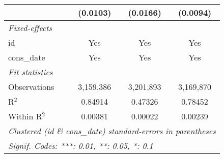 \begin{tabular}{lccc}
                                                             & (0.0103)        & (0.0166)       & (0.0094)\\
   \midrule \emph{Fixed-effects} &   &   &  \\
   id                                                        & Yes             & Yes            & Yes\\
   cons\_date                                               & Yes             & Yes            & Yes\\
   \midrule \emph{Fit statistics} &   &   &  \\
   Observations                                              & 3,159,386       & 3,201,893      & 3,169,870\\
   R$^2$                                                     & 0.84914         & 0.47326        & 0.78452\\
   Within R$^2$                                              & 0.00381         & 0.00022        & 0.00239\\
   \midrule\midrule\multicolumn{4}{l}{\emph{Clustered (id \& cons\_date) standard-errors in parentheses}}\\
   \multicolumn{4}{l}{\emph{Signif. Codes: ***: 0.01, **: 0.05, *: 0.1}}\\
\end{tabular}


